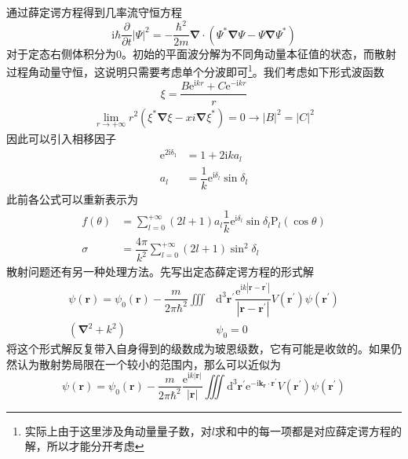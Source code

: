 \documentclass[12pt, a4paper, oneside]{ctexart}
\begin{document}
    \quad\quad 通过薛定谔方程得到几率流守恒方程
    \begin{equation}
    	\mathrm{i}\hbar\dfrac{\partial}{\partial t}\left|\Psi\right|^{2}=-\dfrac{\hbar^{2}}{2m}\boldsymbol{\nabla}\cdot\left(\Psi^{*}\boldsymbol{\nabla}\Psi-\Psi\boldsymbol{\nabla}\Psi^{*}\right)
    \end{equation}
    \quad\quad 对于定态右侧体积分为$0$。初始的平面波分解为不同角动量本征值的状态，而散射过程角动量守恒，这说明只需要考虑单个分波即可\footnote{实际上由于这里涉及角动量量子数，对$l$求和中的每一项都是对应薛定谔方程的解，所以才能分开考虑}。我们考虑如下形式波函数
    \begin{equation}
    	\xi=\dfrac{B\mathrm{e}^{\mathrm{i}kr}+C\mathrm{e}^{-\mathrm{i}kr}}{r}
    \end{equation}
    \begin{align}
    	\lim_{r\to+\infty}r^{2}\left(\xi^{*}\boldsymbol{\nabla}\xi-xi\boldsymbol{\nabla}\xi^{*}\right)=0\to\left|B\right|^{2}=\left|C\right|^{2}
    \end{align}
    \quad\quad 因此可以引入相移因子
    \begin{align}
    	\mathrm{e}^{\mathrm{2i\delta_{l}}}&=1+2\mathrm{i}ka_{l}\\
    	a_{l}&=\dfrac{1}{k}\mathrm{e}^{\mathrm{i}\delta_{l}}\sin\delta_{l}
    \end{align}
    \quad\quad 此前各公式可以重新表示为
    \begin{align}
    	f\left(\theta\right)&=\sum_{l=0}^{+\infty}\left(2l+1\right)a_{l}\dfrac{1}{k}\mathrm{e}^{\mathrm{i}\delta_{l}}\sin\delta_{l}\mathrm{P}_{l}\left(\cos\theta\right)\\
    	\sigma&=\dfrac{4\pi}{k^{2}}\sum_{l=0}^{+\infty}\left(2l+1\right)\sin^{2}\delta_{l}
    \end{align}
    \quad\quad 散射问题还有另一种处理方法。先写出定态薛定谔方程的形式解
    \begin{align}
    	\psi\left(\boldsymbol{r}\right)=\psi_{0}\left(\boldsymbol{r}\right)-\dfrac{m}{2\pi\hbar^{2}}\iiint&\mathrm{d}^{3}\boldsymbol{r^{\prime}}\dfrac{\mathrm{e}^{\mathrm{i}k\left|\boldsymbol{r}-\boldsymbol{r^{\prime}}\right|}}{\left|\boldsymbol{r}-\boldsymbol{r^{\prime}}\right|}V\left(\boldsymbol{r^{\prime}}\right)\psi\left(\boldsymbol{r^{\prime}}\right)\\
    	\left(\boldsymbol{\nabla}^{2}+k^{2}\right)&\psi_{0}=0
    \end{align}
    \quad\quad 将这个形式解反复带入自身得到的级数成为玻恩级数，它有可能是收敛的。如果仍然认为散射势局限在一个较小的范围内，那么可以近似为
    \begin{equation}
    	\psi\left(\boldsymbol{r}\right)=\psi_{0}\left(\boldsymbol{r}\right)-\dfrac{m}{2\pi\hbar^{2}}\dfrac{\mathrm{e}^{\mathrm{i}k\left|\boldsymbol{r}\right|}}{\left|\boldsymbol{r}\right|}\iiint\mathrm{d}^{3}\boldsymbol{r^{\prime}}\mathrm{e}^{-\mathrm{i}\boldsymbol{k_{r}}\cdot\boldsymbol{r^{\prime}}}V\left(\boldsymbol{r^{\prime}}\right)\psi\left(\boldsymbol{r^{\prime}}\right)
    \end{equation}
\end{document}
